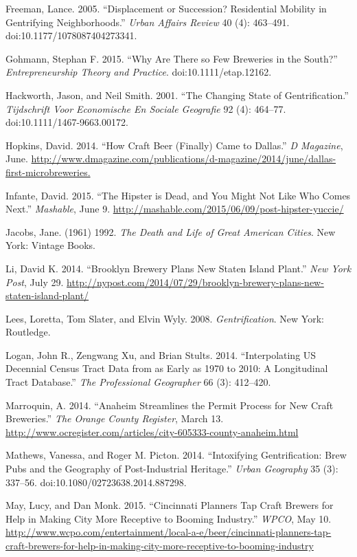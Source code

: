\documentclass[]{article}
\begin{document}
Freeman, Lance. 2005. ``Displacement or Succession? Residential Mobility
in Gentrifying Neighborhoods.'' \emph{Urban Affairs Review} 40 (4):
463--491. doi:10.1177/1078087404273341.

Gohmann, Stephan F. 2015. ``Why Are There so Few Breweries in the
South?'' \emph{Entrepreneurship Theory and Practice}.
doi:10.1111/etap.12162.

Hackworth, Jason, and Neil Smith. 2001. ``The Changing State of
Gentrification.'' \emph{Tijdschrift Voor Economische En Sociale
Geografie} 92 (4): 464--77. doi:10.1111/1467-9663.00172.

Hopkins, David. 2014. ``How Craft Beer (Finally) Came to Dallas.''
\emph{D Magazine}, June.
\url{http://www.dmagazine.com/publications/d-magazine/2014/june/dallas-first-microbreweries.}

Infante, David. 2015. ``The Hipster is Dead, and You Might Not Like Who
Comes Next.'' \emph{Mashable}, June 9.
\url{http://mashable.com/2015/06/09/post-hipster-yuccie/}

Jacobs, Jane. (1961) 1992. \emph{The Death and Life of Great American
Cities}. New York: Vintage Books.

Li, David K. 2014. ``Brooklyn Brewery Plans New Staten Island Plant.''
\emph{New York Post}, July 29.
\url{http://nypost.com/2014/07/29/brooklyn-brewery-plans-new-staten-island-plant/}

Lees, Loretta, Tom Slater, and Elvin Wyly. 2008. \emph{Gentrification}.
New York: Routledge.

Logan, John R., Zengwang Xu, and Brian Stults. 2014. ``Interpolating US
Decennial Census Tract Data from as Early as 1970 to 2010: A
Longitudinal Tract Database.'' \emph{The Professional Geographer} 66
(3): 412--420.

Marroquin, A. 2014. ``Anaheim Streamlines the Permit Process for New
Craft Breweries.'' \emph{The Orange County Register}, March 13.
\url{http://www.ocregister.com/articles/city-605333-county-anaheim.html}

Mathews, Vanessa, and Roger M. Picton. 2014. ``Intoxifying
Gentrification: Brew Pubs and the Geography of Post-Industrial
Heritage.'' \emph{Urban Geography} 35 (3): 337--56.
doi:10.1080/02723638.2014.887298.

May, Lucy, and Dan Monk. 2015. ``Cincinnati Planners Tap Craft Brewers
for Help in Making City More Receptive to Booming Industry.''
\emph{WPCO}, May 10.
\url{http://www.wcpo.com/entertainment/local-a-e/beer/cincinnati-planners-tap-craft-brewers-for-help-in-making-city-more-receptive-to-booming-industry}
\end{document}
